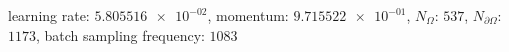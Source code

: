 learning rate: $\num[scientific-notation=true]{5.805516e-02}$, momentum: $\num[scientific-notation=true]{9.715522e-01}$, $N_{\Omega}$: $\num[scientific-notation=false]{537}$, $N_{\partial\Omega}$: $\num[scientific-notation=false]{1173}$, batch sampling frequency: $\num[scientific-notation=false]{1083}$